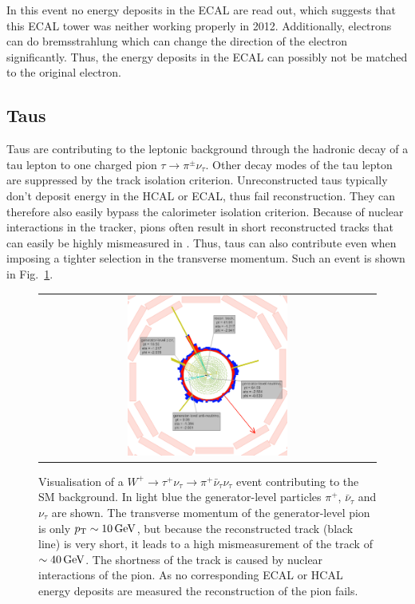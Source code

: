 In this event no energy deposits in the ECAL are read out, which suggests that this ECAL tower was neither working properly in 2012.
Additionally, electrons can do bremsstrahlung which can change the direction of the electron significantly.
Thus, the energy deposits in the ECAL can possibly not be matched to the original electron.

\subsection*{Taus}
Taus are contributing to the leptonic background through the hadronic decay of a tau lepton to one charged pion $\tau\rightarrow\pi^{\pm}\nu_{\tau}$.
Other decay modes of the tau lepton are suppressed by the track isolation criterion.
Unreconstructed taus typically don't deposit energy in the HCAL or ECAL, thus fail reconstruction.
They can therefore also easily bypass the calorimeter isolation criterion.
Because of nuclear interactions in the tracker, pions often result in short reconstructed tracks that can easily be highly mismeasured in \pt.
Thus, taus can also contribute even when imposing a tighter selection in the transverse momentum.
Such an event is shown in Fig.~\ref{fig:LostTau}.  
\begin{figure}[!tb]
  \centering 
  \begin{tabular}{c}
    \includegraphics[width=0.49\textwidth]{figures/analysis/Background/LostTau_lumi_20940_event_8369426.png}
  \end{tabular}
  \caption{Visualisation of a $W^{+}\rightarrow \tau^{+}\nu_{\tau} \rightarrow \pi^{+}\bar{\nu}_{\tau} \nu_{\tau} $ event contributing to the SM background. 
           In light blue the generator-level particles $\pi^{+}$, $\bar{\nu}_{\tau}$ and $\nu_{\tau}$ are shown.
           The transverse momentum of the generator-level pion is only $p_{\text{T}}\sim10\,\text{Ge}\kern-0.06667em\text{V}$, but because the reconstructed track (black line) is very short, it leads to a high mismeasurement of the track \pt of $\sim40\,\text{Ge}\kern-0.06667em\text{V}$.
           The shortness of the track is caused by nuclear interactions of the pion.
           As no corresponding ECAL or HCAL energy deposits are measured the reconstruction of the pion fails.}
  \label{fig:LostTau}
\end{figure}

